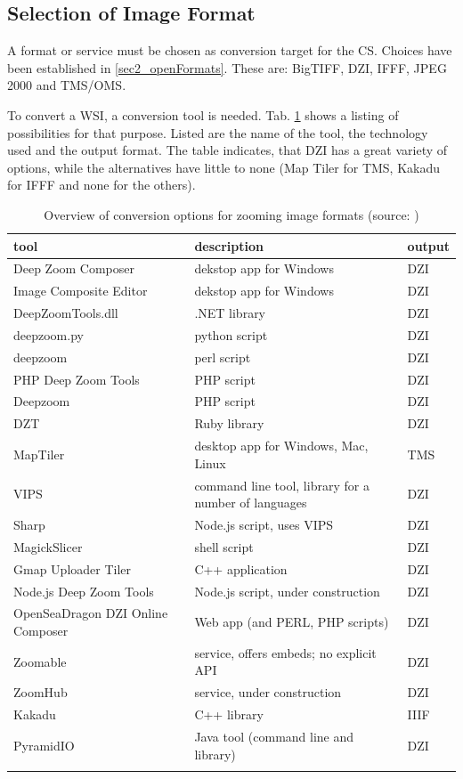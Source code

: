 \subsection{Selection of Image Format}
A format or service must be chosen as conversion target for the CS. Choices have been established in \ref{sec2_openFormats}. These are: BigTIFF, DZI, IFFF, JPEG 2000 and TMS/OMS.

To convert a WSI, a conversion tool is needed. Tab. \ref{tab3_convOptions} shows a listing of possibilities for that purpose. Listed are the name of the tool, the technology used and the output format. The table indicates, that DZI has a great variety of options, while the alternatives have little to none (Map Tiler for TMS, Kakadu for IFFF and none for the others).

\begin{longtable}{| p{3cm} | p{4cm} | p{2.5cm} |}
	\hline
	\textbf{tool} & \textbf{description} & \textbf{output} \\ \hline
	Deep Zoom Composer & dekstop app for Windows & DZI \\ \hline
	Image Composite Editor & dekstop app for Windows & DZI \\ \hline
	DeepZoomTools.dll & .NET library & DZI \\ \hline
	deepzoom.py & python script& DZI \\ \hline
	deepzoom & perl script & DZI \\ \hline
	PHP Deep Zoom Tools & PHP script & DZI \\ \hline
	Deepzoom & PHP script & DZI \\ \hline
	DZT & Ruby library & DZI \\ \hline
	MapTiler &  desktop app for Windows, Mac, Linux & TMS \\ \hline
	VIPS & command line tool, library for a number of languages & DZI \\ \hline
	Sharp & Node.js script, uses VIPS & DZI \\ \hline
	MagickSlicer & shell script & DZI \\ \hline
	Gmap Uploader Tiler & C++ application & DZI \\ \hline
	Node.js Deep Zoom Tools & Node.js script, under construction & DZI \\ \hline
	OpenSeaDragon DZI Online Composer & Web app (and PERL, PHP scripts) & DZI \\ \hline
	Zoomable & service, offers embeds; no explicit API & DZI \\ \hline
	ZoomHub & service, under construction & DZI \\ \hline
	Kakadu & C++ library & IIIF \\ \hline
	PyramidIO & Java tool (command line and library) & DZI \\ \hline
	\caption{Overview of conversion options for zooming image formats (source: \cite{web:openseadragon})}
	\label{tab3_convOptions}
\end{longtable}

